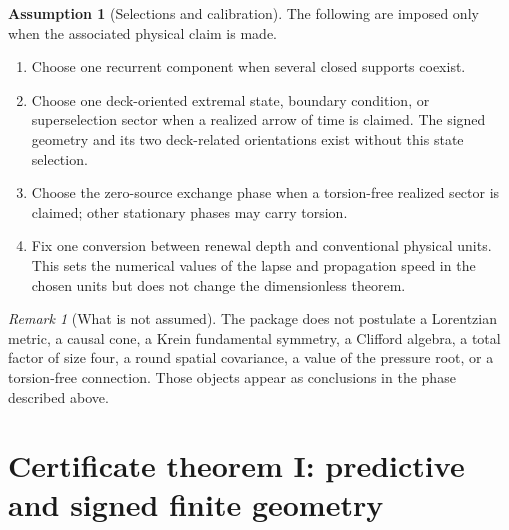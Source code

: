 \documentclass[11pt]{article}
\theoremstyle{definition}
\newtheorem{assumption}[theorem]{Assumption}
\theoremstyle{remark}
\newtheorem{remark}[theorem]{Remark}
\begin{document}
\begin{assumption}[Selections and calibration]
\label{ass:selections}
The following are imposed only when the associated physical claim is made.
\begin{enumerate}[label=\textup{(S\arabic*)},leftmargin=3em]
\item Choose one recurrent component when several closed supports coexist.
\item Choose one deck-oriented extremal state, boundary condition, or
      superselection sector when a realized arrow of time is claimed.  The
      signed geometry and its two deck-related orientations exist without this
      state selection.
\item Choose the zero-source exchange phase when a torsion-free realized sector
      is claimed; other stationary phases may carry torsion.
\item Fix one conversion between renewal depth and conventional physical units.
      This sets the numerical values of the lapse and propagation speed in the
      chosen units but does not change the dimensionless theorem.
\end{enumerate}
\end{assumption}

\begin{remark}[What is not assumed]
The package does not postulate a Lorentzian metric, a causal cone, a Krein
fundamental symmetry, a Clifford algebra, a total factor of size four, a round
spatial covariance, a value of the pressure root, or a torsion-free connection.
Those objects appear as conclusions in the phase described above.
\end{remark}

\section{Certificate theorem I: predictive and signed finite geometry}
\end{document}

